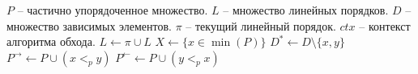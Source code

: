 \begin{algorithm}[H]
  \caption{Обход частично упорядоченного множества с учётом зависимостей}
  \label{alg:topo-dep}
  \begin{algorithmic}[1]
    \Require $P$ -- частично упорядоченное множество.
    \Require $L$ -- множество линейных порядков.
    \Require $D$ -- множество зависимых элементов.
    \Require $\pi$ -- текущий линейный порядок.
    \Require $ctx$ -- контекст алгоритма обхода.
    \State $L \gets \pi \cup L$ 
    \State \Return
    \EndIf
    \State $X \gets \{ x \in \min(P) \}$ \label{alg:line:X}
      \label{alg:line:loop}
    \State \Return {}
    \EndIf
    \label{alg:line:orig_cond}
    \State {} 
    \State {}
    \EndIf
    \State $D^{*} \gets D \setminus \{x, y\}$ \label{alg:line:delD}
    \State $P^{\rightarrow} \gets P \cup (x <_{p} y)$
    \label{alg:line:pright}
    \State $P^{\leftarrow} \gets P \cup (y <_{p} x)$
    \label{alg:line:pleft}
    \State {}
    \State {}
    \EndFor
    \EndFunction
  \end{algorithmic}
\end{algorithm}

